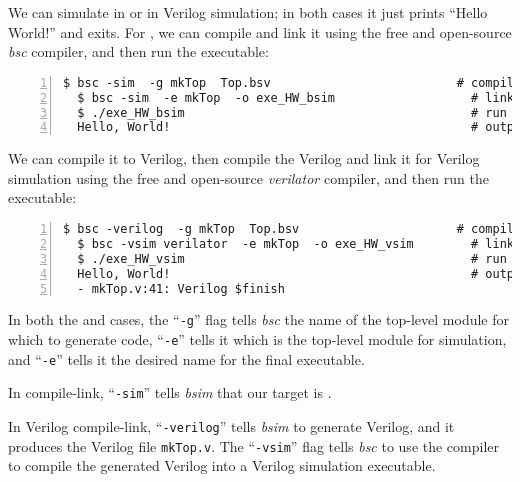 \vspace{1ex}

We can simulate in {\BLUESIM} or in Verilog simulation; in both cases it
just prints ``Hello World!'' and exits.  For {\BLUESIM}, we can compile
and link it using the free and open-source \emph{bsc} compiler, and
then run the executable:

{\footnotesize
\begin{Verbatim}[frame=single, numbers=left]
  $ bsc -sim  -g mkTop  Top.bsv                          # compile
  $ bsc -sim  -e mkTop  -o exe_HW_bsim                   # link
  $ ./exe_HW_bsim                                        # run
  Hello, World!                                          # output
\end{Verbatim}
}

We can compile it to Verilog, then compile the Verilog and link it for
Verilog simulation using the free and open-source \emph{verilator}
compiler, and then run the executable:

{\footnotesize
\begin{Verbatim}[frame=single, numbers=left]
  $ bsc -verilog  -g mkTop  Top.bsv                      # compile -> mkTop.v
  $ bsc -vsim verilator  -e mkTop  -o exe_HW_vsim        # link
  $ ./exe_HW_vsim                                        # run
  Hello, World!                                          # output
  - mkTop.v:41: Verilog $finish
\end{Verbatim}
}

In both the {\BLUESIM} and {\Verilator} cases, the ``\verb|-g|'' flag tells
\emph{bsc} the name of the top-level module for which to generate
code, ``\verb|-e|'' tells it which is the top-level module for
simulation, and ``\verb|-e|'' tells it the desired name for the final
executable.

In {\BLUESIM} compile-link, ``\verb|-sim|'' tells \emph{bsim} that our
target is {\BLUESIM}.

In Verilog compile-link, ``\verb|-verilog|'' tells \emph{bsim} to
generate Verilog, and it produces the Verilog file \verb|mkTop.v|.
The ``\verb|-vsim|'' flag tells \emph{bsc} to use the {\Verilator}
compiler to compile the generated Verilog into a Verilog simulation
executable.




